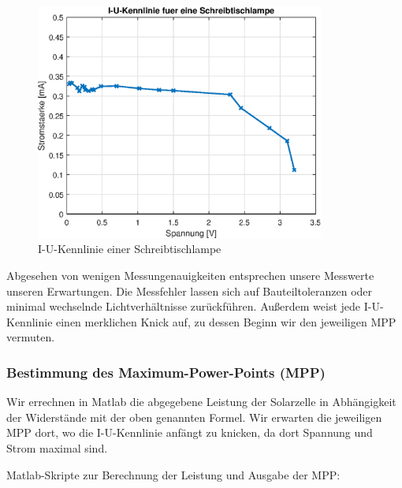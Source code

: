 \begin{figure}[htb]
\centering
\includegraphics[width=9.5cm]{pictures/I-U/Schreibtischlampe-UI.eps}
\caption{I-U-Kennlinie einer Schreibtischlampe}
\label{fig:I_U_Schreibtischlampe}
\end{figure}


Abgesehen von wenigen Messungenauigkeiten entsprechen unsere Messwerte unseren Erwartungen.
Die Messfehler lassen sich auf Bauteiltoleranzen oder minimal wechselnde Lichtverhältnisse zurückführen.
Außerdem weist jede I-U-Kennlinie einen merklichen Knick auf, zu dessen Beginn wir den jeweiligen MPP vermuten.

\subsubsection{Bestimmung des Maximum-Power-Points (MPP)}


Wir errechnen in Matlab die abgegebene Leistung der Solarzelle in Abhängigkeit der Widerstände mit der oben genannten Formel.
Wir erwarten die jeweiligen MPP dort, wo die I-U-Kennlinie anfängt zu knicken, da dort Spannung und Strom maximal sind.

Matlab-Skripte zur Berechnung der Leistung und Ausgabe der MPP:




